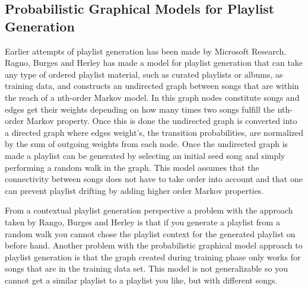 \documentclass[a4paper,11pt]{kth-mag}
\begin{document}
\subsection{Probabilistic Graphical Models for Playlist Generation}
Earlier attempts of playlist generation has been made by Microsoft Research. Ragno, Burges and Herley has made a model for playlist generation that can take any type of ordered playlist material, such as curated playlists or albums, as training data, and constructs an undirected graph between songs that are within the reach of a nth-order Markov model. In this graph nodes constitute songs and edges get their weights depending on how many times two songs fulfill the nth-order Markov property. Once this is done the undirected graph is converted into a directed graph where edges weight's, the transition probabilities, are normalized by the sum of outgoing weights from each node. Once the undirected graph is made a playlist can be generated by selecting an initial seed song and simply performing a random walk in the graph. This model assumes that the connectivity between songs does not have to take order into account and that one can prevent playlist drifting by adding higher order Markov properties\cite{ragno2005inferring}. 

From a contextual playlist generation perspective a problem with the approach taken by Rango, Burges and Herley is that if you generate a playlist from a random walk you cannot chose the playlist context for the generated playlist on before hand. Another problem with the probabilistic graphical model approach to playlist generation is that the graph created during training phase only works for songs that are in the training data set. This model is not generalizable so you cannot get a similar playlist to a playlist you like, but with different songs.
\end{document}
